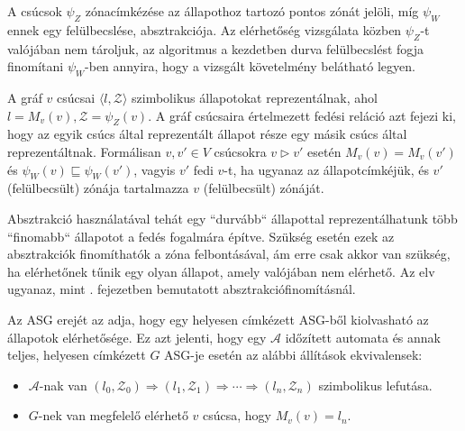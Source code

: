 A csúcsok $\psi_Z$ zónacímkézése az állapothoz tartozó pontos zónát jelöli, míg $\psi_W$ ennek egy felülbecslése, absztrakciója. Az elérhetőség vizsgálata közben $\psi_Z$-t valójában nem tároljuk, az algoritmus a kezdetben durva felülbecslést fogja finomítani $\psi_W$-ben annyira, hogy a vizsgált követelmény belátható legyen.

A gráf $v$ csúcsai $\langle l, \mathcal{Z} \rangle$  szimbolikus állapotokat reprezentálnak, ahol $l=M_v(v), \mathcal{Z}=\psi_Z(v)$. A gráf csúcsaira értelmezett fedési reláció azt fejezi ki, hogy az egyik csúcs által reprezentált állapot része egy másik csúcs által reprezentáltnak. Formálisan $v,v' \in V$ csúcsokra $v \rhd v'$ esetén $M_v(v)=M_v(v')$ és $\psi_W(v) \sqsubseteq \psi_W(v')$, vagyis $v'$ fedi $v$-t, ha ugyanaz az állapotcímkéjük, és $v'$ (felülbecsült) zónája tartalmazza $v$ (felülbecsült) zónáját.


Absztrakció használatával tehát egy ``durvább`` állapottal reprezentálhatunk több ``finomabb`` állapotot a fedés fogalmára építve. Szükség esetén ezek az absztrakciók finomíthatók a zóna felbontásával, ám erre csak akkor van szükség, ha elérhetőnek tűnik egy olyan állapot, amely valójában nem elérhető. Az elv ugyanaz, mint . fejezetben bemutatott absztrakciófinomításnál.

Az ASG erejét az adja, hogy egy helyesen címkézett ASG-ből kiolvasható az állapotok elérhetősége. Ez azt jelenti, hogy egy $\mathcal{A}$ időzített automata és annak teljes, helyesen címkézett $G$ ASG-je esetén az alábbi állítások ekvivalensek:
\begin{itemize}
    \item $\mathcal{A}$-nak van $(l_0, \mathcal{Z}_0) \Rightarrow (l_1, \mathcal{Z}_1) \Rightarrow \cdots \Rightarrow (l_n, \mathcal{Z}_n)$ szimbolikus lefutása.
    \item $G$-nek van megfelelő elérhető $v$ csúcsa, hogy $M_v(v) = l_n$.
\end{itemize}


